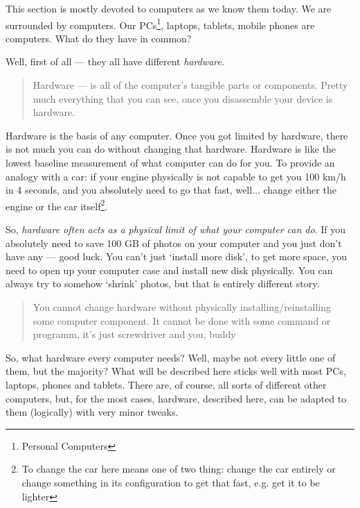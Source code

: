 \documentclass{report}
\begin{document}
            This section is mostly devoted to computers as we know them today. We are surrounded by computers. Our PCs\footnote{Personal Computers}, laptops, tablets, 
            mobile phones are computers. What do they have in common? \par

            Well, first of all --- they all have different \emph{hardware}. 
            \begin{quote}
                Hardware --- is all of the computer's tangible parts or components. Pretty much everything that you can see, once you disassemble your device is hardware.
            \end{quote}

            Hardware is the basis of any computer. Once you got limited by hardware, there is not much you can do without changing that hardware. Hardware is like the lowest
            baseline measurement of what computer can do for you. To provide an analogy with a car: if your engine physically is not capable to get you 100 km/h in 4 seconds, 
            and you absolutely need to go that fast, well... change either the engine or the car itself\footnote{To change the car here means one of two thing: change
            the car entirely or change something in its configuration to get that fast, e.g. get it to be lighter}. \par

            So, \emph{hardware often acts as a physical limit of what your computer can do}. If you absolutely need to save 100 GB of photos on your computer and you just
            don't have any --- good luck. You can't just `install more disk', to get more space, you need to open up your computer case and install new disk physically. You
            can always try to somehow `shrink' photos, but that is entirely different story. \par

            \begin{quote}
                You cannot change hardware without physically installing/reinstalling some computer component. It cannot be done with some command or programm, 
                it's just screwdriver and you, buddy
            \end{quote}

            So, what hardware every computer needs? Well, maybe not every little one of them, but the majority? What will be described here sticks well with most PCs, laptops,
            phones and tablets. There are, of course, all sorts of different other computers, but, for the most cases, hardware, described here, can be adapted to them (logically)
            with very minor tweaks. \par
\end{document}
